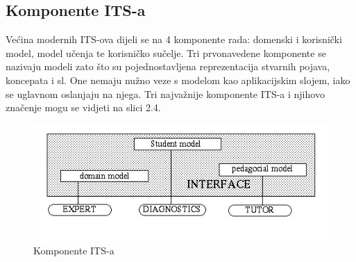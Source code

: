 \documentclass[times, utf8, zavrsni, numeric]{fer}
\begin{document}
\subsection{Komponente ITS-a}
Većina modernih ITS-ova dijeli se na 4 komponente rada: domenski i korisnički model, model učenja te korisničko sučelje. Tri prvonavedene komponente se nazivaju modeli zato što su pojednostavljena reprezentacija stvarnih pojava, koncepata i sl.\cite{aect} One nemaju nužno veze s modelom kao aplikacijskim slojem, iako se uglavnom oslanjaju na njega. Tri najvažnije komponente ITS-a i njihovo značenje mogu se vidjeti na slici 2.4.

\begin{figure}[htb]
\centering
\includegraphics[]{img/ITS-components.jpg}
\caption{Komponente ITS-a\cite{itscomponents}}
\label{fig:its-comp}
\end{figure}
\end{document}
